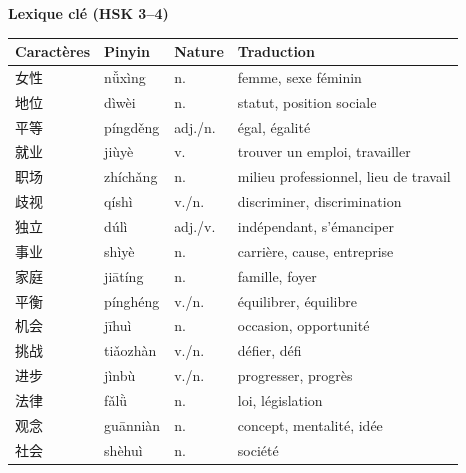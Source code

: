 \documentclass[11pt]{article}
\begin{document}
\begin{bilan}

\textbf{Lexique clé (HSK 3--4)}\par
\begin{center}
\begin{tabularx}{\linewidth}{|X|X|X|X|}
\hline
\rowcolor{popblueL}
\textbf{Caractères} & \textbf{Pinyin} & \textbf{Nature} & \textbf{Traduction} \\
\hline
女性 & nǚxìng & n. & femme, sexe féminin \\
地位 & dìwèi & n. & statut, position sociale \\
平等 & píngděng & adj./n. & égal, égalité \\
就业 & jiùyè & v. & trouver un emploi, travailler \\
职场 & zhíchǎng & n. & milieu professionnel, lieu de travail \\
歧视 & qíshì & v./n. & discriminer, discrimination \\
独立 & dúlì & adj./v. & indépendant, s'émanciper \\
事业 & shìyè & n. & carrière, cause, entreprise \\
家庭 & jiātíng & n. & famille, foyer \\
平衡 & pínghéng & v./n. & équilibrer, équilibre \\
机会 & jīhuì & n. & occasion, opportunité \\
挑战 & tiǎozhàn & v./n. & défier, défi \\
进步 & jìnbù & v./n. & progresser, progrès \\
法律 & fǎlǜ & n. & loi, législation \\
观念 & guānniàn & n. & concept, mentalité, idée \\
社会 & shèhuì & n. & société \\
\hline
\end{tabularx}
\end{center}


\end{bilan}
\end{document}
